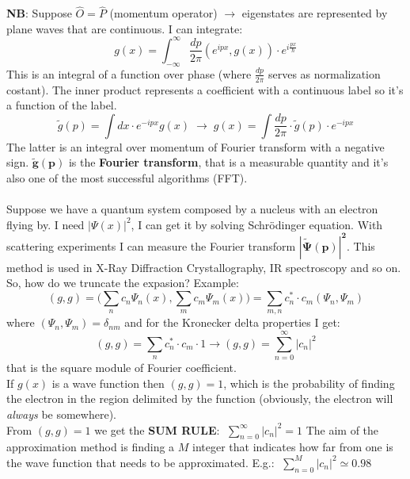 \textbf{NB}: Suppose $\hat{O}=\hat{P}$ (momentum operator) $\rightarrow$ eigenstates are represented by plane waves that are continuous. I can integrate:\\
\[
g(x)=\int_{-\infty}^{\infty}\frac{dp}{2\pi}(e^{ipx},g(x))\cdot e^{i\frac{px}{\hbar}}
\]
This is an integral of a function over phase (where $\frac{dp}{2\pi}$ serves as normalization costant). The inner product represents a coefficient with a continuous label so it's a function of the label.
\[
\tilde{g}(p)=\int dx\cdot e^{-ipx}g(x)\; \rightarrow \; g(x)=\int \frac{dp}{2\pi} \cdot \tilde{g}(p) \cdot e^{-ipx}
\]
The latter is an integral over momentum of Fourier transform with a negative sign.
$\mathbf{\tilde{g}(p)}$ is the \textbf{Fourier transform}, that is a measurable quantity and it's also one of the most successful algorithms (FFT).\\
\\
Suppose we have a quantum system composed by a nucleus with an electron flying by. I need $|\Psi(x)|^2$, I can get it by solving Schr{\"o}dinger equation. With scattering experiments I can measure the Fourier transform $\mathbf{|\tilde{\Psi}(p)|^2}$. This method is used in X-Ray Diffraction Crystallography, IR spectroscopy and so on.
\newline
So, how do we truncate the expasion? Example:
\[
(g,g)=\biggl(\sum_nc_n\Psi_n(x), \sum_mc_m\Psi_m(x)\biggr) = \sum_{m,n}c_n^*\cdot c_m(\Psi_n, \Psi_m)
\]
where $(\Psi_n,\Psi_m)=\delta_{nm}$ and for the Kronecker delta properties I get:
\[
(g,g)= \sum_nc_n^* \cdot c_m \cdot 1 \rightarrow (g,g)=\sum_{n=0}^{\infty}|c_n|^2
\]
that is the square module of Fourier coefficient.\\
If $g(x)$ is a wave function then $(g,g)=1$, which is the probability of finding the electron in the region delimited by the function (obviously, the electron will \textit{always} be somewhere).\\
\newline
From $(g,g)=1$ we get the \textbf{SUM RULE}: $\; \sum_{n=0}^{\infty}|c_n|^2=1$
The aim of the approximation method is finding a $M$ integer that indicates how far from one is the wave function that needs to be approximated. E.g.: $\; \sum_{n=0}^{M}|c_n|^2 \simeq 0.98$\\

\noindent
